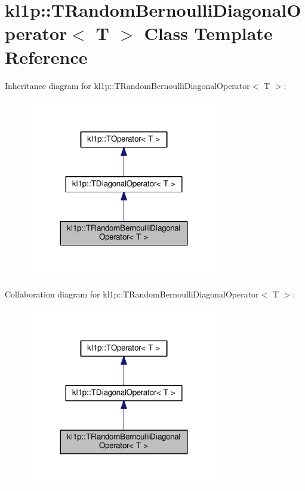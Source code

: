 \hypertarget{classkl1p_1_1TRandomBernoulliDiagonalOperator}{}\section{kl1p\+:\+:T\+Random\+Bernoulli\+Diagonal\+Operator$<$ T $>$ Class Template Reference}
\label{classkl1p_1_1TRandomBernoulliDiagonalOperator}


Inheritance diagram for kl1p\+:\+:T\+Random\+Bernoulli\+Diagonal\+Operator$<$ T $>$\+:
\nopagebreak
\begin{figure}[H]
\begin{center}
\leavevmode
\includegraphics[width=239pt]{classkl1p_1_1TRandomBernoulliDiagonalOperator__inherit__graph}
\end{center}
\end{figure}


Collaboration diagram for kl1p\+:\+:T\+Random\+Bernoulli\+Diagonal\+Operator$<$ T $>$\+:
\nopagebreak
\begin{figure}[H]
\begin{center}
\leavevmode
\includegraphics[width=239pt]{classkl1p_1_1TRandomBernoulliDiagonalOperator__coll__graph}
\end{center}
\end{figure}
